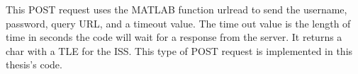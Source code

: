 \documentclass[12pt]{article}
\begin{document}
This POST request uses the MATLAB function urlread to send the username, password, query URL, and a timeout value. The time out value is the length of time in seconds the code will wait for a response from the server. It returns a char with a TLE for the ISS. This type of POST request is implemented in this thesis's code. 

\end{document}

